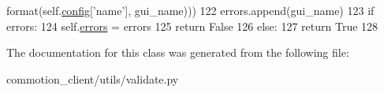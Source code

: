 \begin{DoxyCode}
      format(self.\hyperlink{classcommotion__client_1_1utils_1_1validate_1_1ClientConfig_acce323dd2fef1e3c2819cd0ed068cb67}{config}[\textcolor{stringliteral}{'name'}], gui\_name)))
122                     errors.append(gui\_name)
123         \textcolor{keywordflow}{if} errors:
124             self.\hyperlink{classcommotion__client_1_1utils_1_1validate_1_1ClientConfig_ae3bf78ef12869745641fcf0fcd7f422f}{errors} = errors
125             \textcolor{keywordflow}{return} \textcolor{keyword}{False}
126         \textcolor{keywordflow}{else}:
127             \textcolor{keywordflow}{return} \textcolor{keyword}{True}
128 

\end{DoxyCode}


The documentation for this class was generated from the following file\-:\begin{DoxyCompactItemize}
\item 
commotion\-\_\-client/utils/validate.\-py\end{DoxyCompactItemize}
